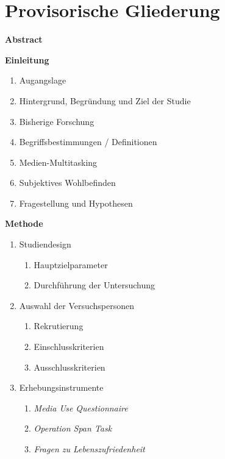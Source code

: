 %
%
\chapter*{Provisorische Gliederung}\label{chap.gliederung}
\glsresetall
\textbf{Abstract}\par

\textbf{Einleitung}\par
\begin{enumerate}
    \item Augangslage
    \item Hintergrund, Begründung und Ziel der Studie
    \item Bisherige Forschung
    \item Begriffsbestimmungen / Definitionen
    \item Medien-Multitasking
    \item Subjektives Wohlbefinden
    \item Fragestellung und Hypothesen
\end{enumerate}

\textbf{Methode}\par
\begin{enumerate}
    \item Studiendesign
    \begin{enumerate}
        \item Hauptzielparameter
        \item Durchführung der Untersuchung
    \end{enumerate}
    \item Auswahl der Versuchspersonen
    \begin{enumerate}
        \item Rekrutierung
        \item Einschlusskriterien
        \item Ausschlusskriterien
    \end{enumerate}    
    \item Erhebungsinstrumente
    \begin{enumerate}
        \item \textit{Media Use Questionnaire}
        \item \textit{Operation Span Task}
        \item \textit{Fragen zu Lebenszufriedenheit}
    \end{enumerate}
\end{enumerate}

